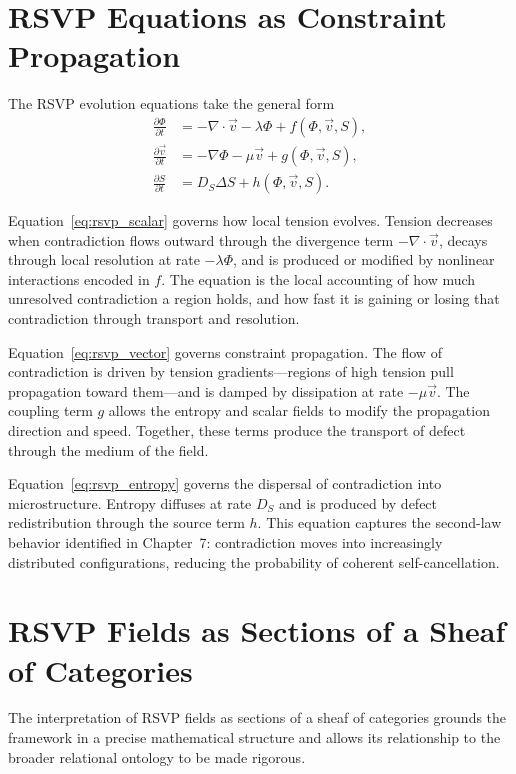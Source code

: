 \documentclass[12pt,a4paper,openany]{book}
\theoremstyle{plain}
\theoremstyle{definition}
\theoremstyle{remark}
\newcommand{\Entropy}{S}
\newcommand{\scalar}{\Phi}
\newcommand{\kvec}{\vec{v}}
\newcommand{\del}{\partial}
\newcommand{\grad}{\nabla}
\newcommand{\lap}{\Delta}
\begin{document}
\section{RSVP Equations as Constraint Propagation}

The RSVP evolution equations take the general form
\begin{align}
\frac{\del \scalar}{\del t} &= -\grad \cdot \kvec - \lambda \scalar + f(\scalar, \kvec, \Entropy), \label{eq:rsvp_scalar} \\
\frac{\del \kvec}{\del t} &= -\grad \scalar - \mu \kvec + g(\scalar, \kvec, \Entropy), \label{eq:rsvp_vector} \\
\frac{\del \Entropy}{\del t} &= D_S \lap \Entropy + h(\scalar, \kvec, \Entropy). \label{eq:rsvp_entropy}
\end{align}

Equation~\eqref{eq:rsvp_scalar} governs how local tension evolves. Tension decreases when contradiction flows outward through the divergence term $-\grad \cdot \kvec$, decays through local resolution at rate $-\lambda \scalar$, and is produced or modified by nonlinear interactions encoded in $f$. The equation is the local accounting of how much unresolved contradiction a region holds, and how fast it is gaining or losing that contradiction through transport and resolution.

Equation~\eqref{eq:rsvp_vector} governs constraint propagation. The flow of contradiction is driven by tension gradients---regions of high tension pull propagation toward them---and is damped by dissipation at rate $-\mu \kvec$. The coupling term $g$ allows the entropy and scalar fields to modify the propagation direction and speed. Together, these terms produce the transport of defect through the medium of the field.

Equation~\eqref{eq:rsvp_entropy} governs the dispersal of contradiction into microstructure. Entropy diffuses at rate $D_S$ and is produced by defect redistribution through the source term $h$. This equation captures the second-law behavior identified in Chapter~7: contradiction moves into increasingly distributed configurations, reducing the probability of coherent self-cancellation.

\section{RSVP Fields as Sections of a Sheaf of Categories}

The interpretation of RSVP fields as sections of a sheaf of categories grounds the framework in a precise mathematical structure and allows its relationship to the broader relational ontology to be made rigorous.
\end{document}
